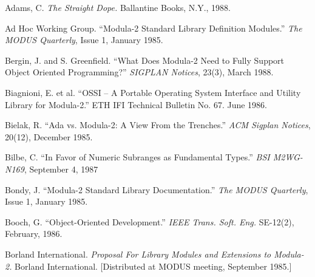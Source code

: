 %
%
%
%

Adams, C. {\em The Straight Dope.} Ballantine Books, N.Y., 1988.
\smallskip

Ad Hoc Working Group. ``Modula-2 Standard Library Definition Modules.''
{\em The MODUS Quarterly}, Issue 1, January 1985.
\smallskip

Bergin, J. and S. Greenfield. ``What Does Modula-2 Need to Fully Support 
Object Oriented Programming?'' {\em SIGPLAN Notices}, 23(3), March 1988.
\smallskip

Biagnioni, E. et al. ``OSSI -- A Portable Operating System Interface and 
Utility Library for Modula-2.'' ETH IFI Technical Bulletin No. 67. June 1986.
\smallskip

Bielak, R. ``Ada vs. Modula-2: A View From the Trenches.''
{\em ACM Sigplan Notices}, 20(12), December 1985.
\smallskip

Bilbe, C. ``In Favor of Numeric Subranges as Fundamental Types.''
{\em BSI M2WG-N169}, September 4, 1987
\smallskip

Bondy, J. ``Modula-2 Standard Library Documentation.'' {\em The MODUS
Quarterly}, Issue 1, January 1985.
\smallskip

Booch, G. ``Object-Oriented Development.'' {\em IEEE Trans. Soft. Eng.}
SE-12(2), February, 1986.
\smallskip

Borland International. {\em Proposal For Library Modules and Extensions 
to Modula-2.} Borland International. [Distributed at MODUS meeting, 
September 1985.]
\smallskip

